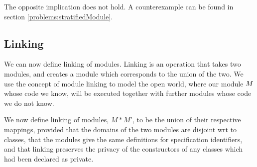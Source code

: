 The opposite implication does not hold. A counterexample can be found in section \ref{problems:stratifiedModule}.





\subsection{Linking}

We can now define linking of modules. Linking is an operation that takes two modules, and creates a module which corresponds  to the union of the two. We use the concept of module linking 
to model the open world, where our module $M$ whose code we know, will be executed together with further modules whose code we do not know.


We now define linking of modules, $M*M'$, to be the  union of their respective mappings, provided that the  domains of the two modules are disjoint wrt to classes, that the modules give the same definitions for specification identifiers, {and that linking preserves the privacy of the constructors of any classes which had been declared as private.}


